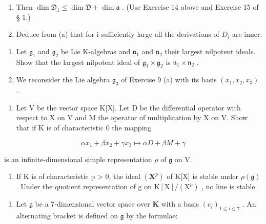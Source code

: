 \begin{enumerate}
\def\labelenumi{(\alph{enumi})}
\item
  Then \(\dim \mathfrak{D}_1 \leqslant \dim \mathfrak{D} + \dim \mathfrak{a}\) . (Use Exercise 14 above and Exercise 15 of § 1.)
\item
  Deduce from (a) that for i sufficiently large all the derivations of \(D_{i}\) are inner.
\end{enumerate}

\begin{enumerate}
\def\labelenumi{\arabic{enumi}.}
\setcounter{enumi}{15}
\item
  Let \(\mathfrak{g}_1\) and \(\mathfrak{g}_2\) be Lie K-algebras and \(\mathfrak{n}_1\) and \(\mathfrak{n}_2\) their largest nilpotent ideals. Show that the largest nilpotent ideal of \(\mathfrak{g}_1 \times \mathfrak{g}_2\) is \(\mathfrak{n}_1 \times \mathfrak{n}_2\) .
\item
  We reconsider the Lie algebra \(\mathfrak{g}_3\) of Exercise 9 (a) with its basis \((x_1, x_2, x_3)\) .
\end{enumerate}

\begin{enumerate}
\def\labelenumi{(\alph{enumi})}
\tightlist
\item
  Let V be the vector space K{[}X{]}. Let D be the differential operator with respect to X on V and M the operator of multiplication by X on V. Show that if K is of characteristic 0 the mapping
\end{enumerate}

\[
\alpha x _ {1} + \beta x _ {2} + \gamma x _ {3} \mapsto \alpha D + \beta M + \gamma
\]

is an infinite-dimensional simple representation \(\rho\) of \(\mathfrak{g}\) on V.

\begin{enumerate}
\def\labelenumi{(\alph{enumi})}
\setcounter{enumi}{1}
\tightlist
\item
  If K is of characteristic p \textgreater{} 0, the ideal \((\mathbf{X}^{p})\) of K{[}X{]} is stable under \(\rho(\mathfrak{g})\) . Under the quotient representation of g on \(\mathrm{K}[\mathrm{X}] / (\mathrm{X}^{p})\) , no line is stable.
\end{enumerate}

\begin{enumerate}
\def\labelenumi{\arabic{enumi}.}
\setcounter{enumi}{17}
\tightlist
\item
  Let \(\mathfrak{g}\) be a 7-dimensional vector space over \(\mathbf{K}\) with a basis \((e_i)_{1\leqslant i\leqslant 7}\) . An alternating bracket is defined on \(\mathfrak{g}\) by the formulae:
\end{enumerate}

